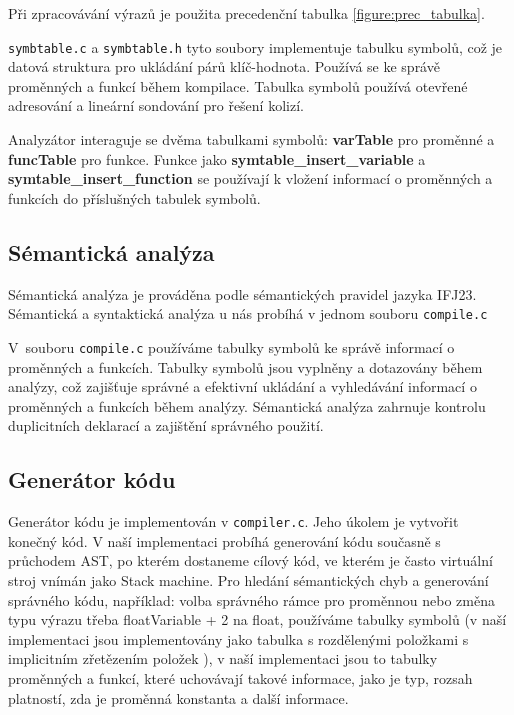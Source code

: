\documentclass[a4paper, 11pt]{article}
\begin{document}
	Při zpracovávání výrazů je použita precedenční tabulka \ref{figure:prec_tabulka}. 

        \verb|symbtable.c| a \verb|symbtable.h| tyto soubory implementuje tabulku symbolů, což je datová struktura pro ukládání párů klíč-hodnota. Používá se ke správě proměnných a funkcí během kompilace. Tabulka symbolů používá otevřené adresování a lineární sondování pro řešení kolizí.

        Analyzátor interaguje se dvěma tabulkami symbolů: \textbf{varTable}  pro proměnné a \textbf{funcTable} pro funkce.
        Funkce jako \textbf{symtable\_insert\_variable} a \textbf{symtable\_insert\_function} se používají k vložení informací o proměnných a funkcích do příslušných tabulek symbolů.
        

	\subsection{Sémantická analýza}

	Sémantická analýza je prováděna podle sémantických pravidel jazyka IFJ23. Sémantická a syntaktická analýza u nás probíhá v jednom souboru \verb|compile.c|

    V~souboru \verb|compile.c| používáme tabulky symbolů ke správě informací o proměnných a funkcích. Tabulky symbolů jsou vyplněny a dotazovány během analýzy, což zajišťuje správné a efektivní ukládání a vyhledávání informací o proměnných a funkcích během analýzy.
    Sémantická analýza zahrnuje kontrolu duplicitních deklarací a zajištění správného použití.



	\subsection{Generátor kódu}
 
        Generátor kódu je implementován v \texttt{compiler.c}. Jeho úkolem je vytvořit
        konečný kód. V naší implementaci probíhá generování kódu současně s průchodem AST, po kterém dostaneme cílový kód, ve kterém je často virtuální stroj vnímán jako Stack machine. Pro hledání sémantických chyb a generování správného kódu, například: volba správného rámce pro proměnnou nebo změna typu výrazu  třeba floatVariable + 2 na float, používáme tabulky symbolů  (v naší implementaci jsou implementovány jako tabulka s rozdělenými položkami s implicitním zřetězením položek ), v naší implementaci jsou to tabulky proměnných a funkcí, které uchovávají takové informace, jako je typ, rozsah platností, zda je proměnná konstanta a další informace. 
\end{document}
